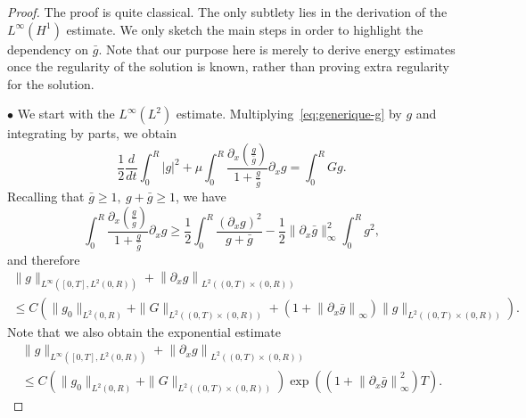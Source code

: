 \documentclass[10pt]{amsart}
\theoremstyle{definition}\newtheorem{defi}[theo]{Definition}\newtheorem{rema}[theo]{Remark}\newtheorem{exam}[theo]{Example}\newtheorem{exem}[theo]{Example}\newtheorem{nota}[theo]{Notation}
\newcommand{\p}{\partial}
\begin{document}
\begin{proof}
The proof is quite classical. The only subtlety lies in the derivation of the $L^\infty(H^1)$ estimate. We only sketch the main steps in order to highlight the dependency on $\bar g$. Note that our purpose here is merely to derive energy estimates once the regularity of the solution is known, rather than proving extra regularity for the solution.


$\bullet$ We start with the $L^\infty(L^2)$ estimate. Multiplying~\eqref{eq:generique-g} by $g$ and integrating by parts, we obtain
\[
\frac{1}{2}\frac{d}{dt}\int_0^R|g|^2 + \mu \int_0^R \frac{\p_x(\frac{g}{\bar g})}{1 + \frac{g}{\bar g}}\p_x g = \int_0^R G g.
\]
Recalling that $\bar g\geq 1,\ g+ \bar g\geq 1$, we have
\[
\int_0^R \frac{\p_x(\frac{g}{\bar g}) }{1 + \frac{g}{\bar g}}\p_x g\geq \frac{1}{2}\int_0^R\frac{(\p_x g)^2}{g+ \bar g} - \frac{1}{2} \|\p_x \bar g\|_\infty^2 \int_0^R g^2,
\]
and therefore
\begin{multline}\label{est:g-generique-L^2}
\|g\|_{L^\infty\left([0,T], L^2(0,R)\right)} + \left\|\p_x g\right\|_{L^2\left((0,T)\times (0,R)\right)}\\
\leq C \left(\|g_0\|_{L^2(0,R)} + \| G\|_{L^2\left((0,T)\times (0,R)\right)} + \left(1+ \left\|\p_x \bar g\right\|_\infty\right) \|g\|_{L^2\left((0,T)\times (0,R)\right)}\right).
\end{multline}
Note that we also obtain the exponential estimate
\begin{multline*}
\|g\|_{L^\infty\left([0,T], L^2(0,R)\right)} + \left\|\p_x g\right\|_{L^2\left((0,T)\times (0,R)\right)}\\
\leq C \left(\|g_0\|_{L^2(0,R)} + \| G\|_{L^2\left((0,T)\times (0,R)\right)}\right)\exp\left(\left(1+ \left\|\p_x \bar g\right\|_\infty^2\right)T\right).
\end{multline*}




\end{proof}
\end{document}
